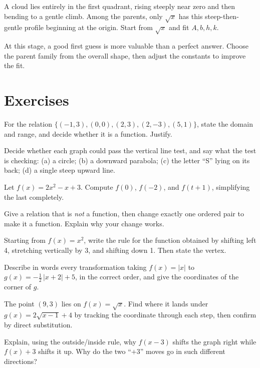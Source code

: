 \documentclass[12pt]{book}
\begin{document}
\begin{example}
A cloud lies entirely in the first quadrant, rising steeply near zero and then
bending to a gentle climb. Among the parents, only $\sqrt{x}$ has this steep-then-
gentle profile beginning at the origin. Start from $\sqrt{x}$ and fit $A,b,h,k$.
\end{example}

At this stage, a good first guess is more valuable than a perfect answer. Choose the
parent family from the overall shape, then adjust the constants to improve the fit.

\section{Exercises}

\begin{exercises}
\item For the relation $\{(-1,3),(0,0),(2,3),(2,-3),(5,1)\}$, state the domain and
range, and decide whether it is a function. Justify.

\item Decide whether each graph could pass the vertical line test, and say what the
test is checking: (a) a circle; (b) a downward parabola; (c) the letter ``S'' lying
on its back; (d) a single steep upward line.

\item Let $f(x)=2x^2-x+3$. Compute $f(0)$, $f(-2)$, and $f(t+1)$, simplifying the
last completely.

\item Give a relation that is \emph{not} a function, then change exactly one ordered
pair to make it a function. Explain why your change works.

\item Starting from $f(x)=x^2$, write the rule for the function obtained by shifting
left 4, stretching vertically by 3, and shifting down 1. Then state the vertex.

\item Describe in words every transformation taking $f(x)=|x|$ to
$g(x)=-\tfrac12\,|x+2|+5$, in the correct order, and give the coordinates of the
corner of $g$.

\item The point $(9,3)$ lies on $f(x)=\sqrt{x}$. Find where it lands under
$g(x)=2\sqrt{x-1}+4$ by tracking the coordinate through each step, then confirm by
direct substitution.

\item Explain, using the outside/inside rule, why $f(x-3)$ shifts the graph right
while $f(x)+3$ shifts it up. Why do the two ``$+3$'' moves go in such different
directions?


\end{exercises}
\end{document}
